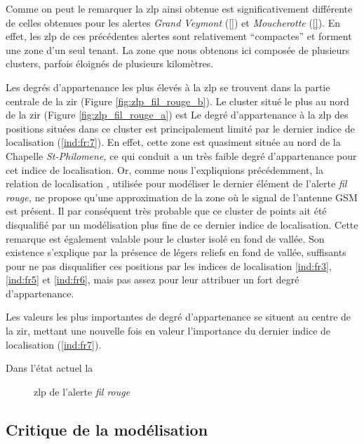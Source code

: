 Comme on peut le remarquer la \ac{zlp} ainsi obtenue est
significativement différente de celles obtenues pour les alertes
\emph{Grand Veymont} (\autoref{}) et \emph{Moucherotte}
(\autoref{}). En effet, les \ac{zlp} de ces précédentes alertes sont
relativement \enquote{compactes} et forment une zone d'un seul
tenant. La zone que nous obtenons ici composée de plusieurs clusters,
parfois éloignés de plusieurs kilomètres.

Les degrés d'appartenance les plus élevés à la \ac{zlp} se trouvent
dans la partie centrale de la \ac{zir} (Figure
\ref{fig:zlp_fil_rouge_b}).
%
Le cluster situé le plus au nord de la \ac{zir} (Figure
\ref{fig:zlp_fil_rouge_a}) est
%
Le degré d'appartenance à la \ac{zlp} des positions situées dans ce
cluster est principalement limité par le dernier indice de
localisation (\ref{ind:fr:7}). En effet, cette zone est quasiment
située au nord de la Chapelle \emph{St-Philomene,} ce qui conduit a un
très faible degré d’appartenance pour cet indice de localisation. Or,
comme nous l'expliquions précédemment, la relation de localisation
, utilisée pour modéliser le dernier élément de
l'alerte \emph{fil rouge,} ne propose qu'une approximation de la zone
où le signal de l'antenne GSM est présent. Il par conséquent très
probable que ce cluster de points ait été disqualifié par un
modélisation plus fine de ce dernier indice de localisation. Cette
remarque est également valable pour le cluster isolé en fond de
vallée. Son existence s'explique par la présence de légers reliefs en
fond de vallée, suffisants pour ne pas disqualifier ces positions par
les indices de localisation \ref{ind:fr3}, \ref{ind:fr5} et
\ref{ind:fr6}, mais pas assez pour leur attribuer un fort degré
d'appartenance.

Les valeurs les plus importantes de degré d'appartenance se situent au
centre de la \ac{zir}, mettant une nouvelle fois en valeur
l'importance du dernier indice de localisation (\ref{ind:fr7}).


Dans l'état actuel la 



\begin{figure}
  \centering
  
  \caption{\ac{zlp} de l'alerte \emph{fil rouge}}
  \label{fig:zlp_fil_rouge}
\end{figure}

\subsection{Critique de la modélisation}
\label{subsec:9-4-3}

